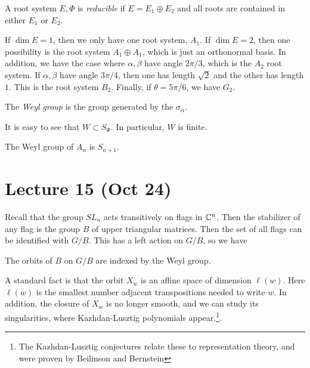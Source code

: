\documentclass[twoside, 10pt]{article}
\begin{document}
    \begin{defn} A root system $E,\Phi$ is \textit{reducible} if $E = E_1
    \oplus E_2$ and all roots are contained in either $E_1$ or $E_2$.
\end{defn}

    \begin{exm} If $\dim E = 1$, then we only have one root system, $A_1$. If
        $\dim E = 2$, then one possibility is the root system $A_1 \oplus A_1$,
        which is just an orthonormal basis. In addition, we have the case where
        $\alpha,\beta$ have angle $2\pi/3$, which is the $A_2$ root system. If
        $\alpha,\beta$ have angle $3\pi/4$, then one has length $\sqrt{2}$ and
        the other has length $1$. This is the root system $B_2$. Finally, if
        $\theta = 5\pi/6$, we have $G_2$.
      
    \end{exm}

    \begin{defn} The \textit{Weyl group} is the group generated by the
    $\sigma_{\alpha}$.  \end{defn}

    It is easy to see that $W \subset S_{\Phi}$. In particular, $W$ is finite.

    \begin{exm} The Weyl group of $A_n$ is $S_{n+1}$.  \end{exm}
    
    \section{Lecture 15 (Oct 24)}%
    
    Recall that the group $SL_n$ acts transitively on flags in $\mathbb{C}^n$. Then the
    stabilizer of any flag is the group $B$ of upper triangular matrices. Then
    the set of all flags can be identified with $G/B$. This has a left action
    on $G/B$, so we have

    \begin{thm}[Bruhat] The orbits of $B$ on $G/B$ are indexed by the Weyl
    group.  \end{thm}

    A standard fact is that the orbit $X_w$ is an affine space of dimension
    $\ell(w)$. Here $\ell(w)$ is the smallest number adjacent transpositions
    needed to write $w$. In addition, the closure of $X_w$ is no longer smooth,
    and we can study its singularities, where Kazhdan-Lusztig polynomials
    appear.\footnote{The Kazhdan-Lusztig conjectures relate these to
    representation theory, and were proven by Beilinson and Bernstein}.
\end{document}
